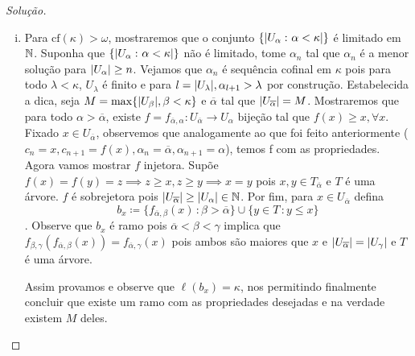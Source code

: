 \documentclass[a4paper]{article}
\begin{document}
\begin{proof}[Solução]
\begin{enumerate}[(i)]
      \item Para \(\text{cf}(\kappa)>\omega\), mostraremos que o conjunto
      \(\{\vert U_\alpha\,\colon\alpha<\kappa \vert\}\) é limitado em \(\mathbb{N}\). Suponha que
      \mbox{\(\{\vert U_\alpha\,\colon\alpha<\kappa \vert\}\)} não é limitado, tome
      \(\alpha_n\) tal que \(\alpha_n\) é a menor solução para
      \(\vert U_\alpha \vert\geq n\). Vejamos que \(\alpha_n\) é sequência cofinal em \(\kappa\)
      pois para todo \(\lambda<\kappa\), \(U_\lambda\) é finito e para
      \(l=\vert U_\lambda \vert,\alpha_{l+1}>\lambda\) por construção.
      Estabelecida a dica, seja \(M=\max\{\vert U_\beta \vert,\beta<\kappa\}\) e
      \(\overline{\alpha}\) tal que
      \(\vert U_{\overline{\alpha}} \vert=M\). Mostraremos que para
      todo \(\alpha>\overline{\alpha}\), existe \(
      f=f_{\overline{\alpha},\alpha}\colon U_{\overline{\alpha}}\rightarrow U_\alpha\) bijeção tal que
      \(f(x)\geq x,\forall x\). Fixado \(x\in U_{\overline{\alpha}}\),
      observemos que analogamente ao que foi
      feito anteriormente
      (\(c_n=x, c_{n+1}=f(x),\alpha_n=\overline{\alpha}, \alpha_{n+1}=\alpha\)), temos f
      com as propriedades. Agora vamos mostrar \(f\) injetora. Supõe
      \(f(x)=f(y)=z\implies z\geq x, z\geq
      y\implies x=y\) pois \(x,y\in T_{\overline{\alpha}}\) e \(T\) é uma
      árvore. \(f\) é sobrejetora pois
      \(\vert U_{\overline{\alpha}} \vert\geq\vert U_\alpha \vert\in\mathbb{N}\).
      Por fim, para \(x\in U_{\overline{\alpha}}\) defina \[b_x\coloneqq
      \{f_{\overline{\alpha},\beta}(x)\,\colon\beta>\overline{\alpha}\}\cup\{y\in T\,\colon y\leq x\}\].
      Observe que \(b_x\) é ramo pois \(\overline{\alpha}<\beta<\gamma\) implica que
      \(f_{\beta,\gamma}(f_{\overline{\alpha},\beta}(x))=f_{\overline{\alpha},\gamma}(x)\)
      pois ambos são  maiores que \(x\) e
      \(\vert U_{\overline{\alpha}} \vert=\vert U_\gamma \vert\) e  \(T\) é uma árvore.
      
      Assim provamos e observe que \(\ell(b_x)=\kappa\), nos permitindo
      finalmente concluir que existe um ramo com as
      propriedades desejadas e na verdade existem \(M\) deles.\qedhere
    \end{enumerate}
    \end{proof}
    
\end{document}
